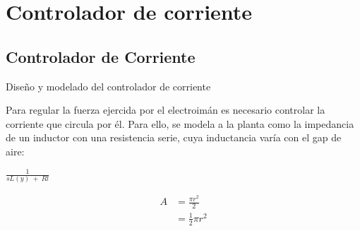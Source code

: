 \chapter{Controlador de corriente}  \label{cap:ControladorCorriente}

\section{Controlador de Corriente}Diseño y modelado del controlador de corriente

Para regular la fuerza ejercida por el electroimán es necesario controlar la corriente que circula por él. Para ello, se modela a la planta como la impedancia de un inductor con una resistencia serie, cuya inductancia varía con el gap de aire:

$\frac{1}{sL(y)\ +\ Rl}$

\begin{equation} \label{eq1}
\begin{split}
A & = \frac{\pi r^2}{2} \\
 & = \frac{1}{2} \pi r^2
\end{split}
\end{equation}